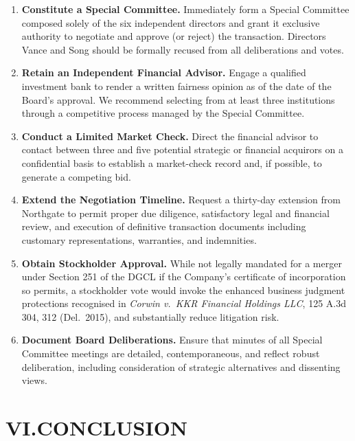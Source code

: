 \documentclass[11pt,letterpaper]{article}
\begin{document}
\begin{enumerate}
  \item \textbf{Constitute a Special Committee.}  Immediately form a Special Committee composed solely of the six independent directors and grant it exclusive authority to negotiate and approve (or reject) the transaction.  Directors Vance and Song should be formally recused from all deliberations and votes.

  \item \textbf{Retain an Independent Financial Advisor.}  Engage a qualified investment bank to render a written fairness opinion as of the date of the Board's approval.  We recommend selecting from at least three institutions through a competitive process managed by the Special Committee.

  \item \textbf{Conduct a Limited Market Check.}  Direct the financial advisor to contact between three and five potential strategic or financial acquirors on a confidential basis to establish a market-check record and, if possible, to generate a competing bid.

  \item \textbf{Extend the Negotiation Timeline.}  Request a thirty-day extension from Northgate to permit proper due diligence, satisfactory legal and financial review, and execution of definitive transaction documents including customary representations, warranties, and indemnities.

  \item \textbf{Obtain Stockholder Approval.}  While not legally mandated for a merger under Section 251 of the DGCL if the Company's certificate of incorporation so permits, a stockholder vote would invoke the enhanced business judgment protections recognised in \textit{Corwin v.\ KKR Financial Holdings LLC}, 125 A.3d 304, 312 (Del.\ 2015), and substantially reduce litigation risk.

  \item \textbf{Document Board Deliberations.}  Ensure that minutes of all Special Committee meetings are detailed, contemporaneous, and reflect robust deliberation, including consideration of strategic alternatives and dissenting views.
\end{enumerate}

\vspace{6pt}

\section*{VI.\quad CONCLUSION}
\end{document}
